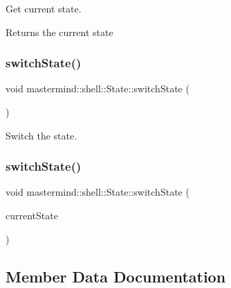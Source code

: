 Get current state. 

\begin{DoxyReturn}{Returns}
the current state 
\end{DoxyReturn}
\hypertarget{classmastermind_1_1shell_1_1_state_ad09ab9698069829ead2841338cf86a6b}{}\label{classmastermind_1_1shell_1_1_state_ad09ab9698069829ead2841338cf86a6b} 
\subsubsection{\texorpdfstring{switch\+State()}{switchState()}\hspace{0.1cm}{\footnotesize\ttfamily [1/2]}}
{\footnotesize\ttfamily void mastermind\+::shell\+::\+State\+::switch\+State (\begin{DoxyParamCaption}{ }\end{DoxyParamCaption})}



Switch the state. 

\hypertarget{classmastermind_1_1shell_1_1_state_a9e4c9895ef013d1d16c1db240ee32344}{}\label{classmastermind_1_1shell_1_1_state_a9e4c9895ef013d1d16c1db240ee32344} 
\subsubsection{\texorpdfstring{switch\+State()}{switchState()}\hspace{0.1cm}{\footnotesize\ttfamily [2/2]}}
{\footnotesize\ttfamily void mastermind\+::shell\+::\+State\+::switch\+State (\begin{DoxyParamCaption}\item[{const \hyperlink{classmastermind_1_1shell_1_1_state_a7667dd4920335355f616e9ffc2793d0b}{Game\+State} \&}]{current\+State }\end{DoxyParamCaption})\hspace{0.3cm}{\ttfamily [protected]}}



\subsection{Member Data Documentation}
\hypertarget{classmastermind_1_1shell_1_1_state_a499c4fed4175dd2cc71d325882d3049e}{}\label{classmastermind_1_1shell_1_1_state_a499c4fed4175dd2cc71d325882d3049e} 
